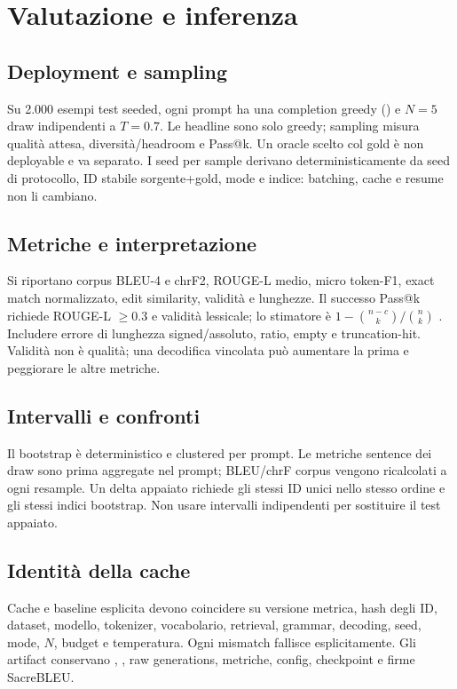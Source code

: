 \chapter{Valutazione e inferenza}\label{chap:evaluation}
\section{Deployment e sampling}
Su 2.000 esempi test seeded, ogni prompt ha una completion 
greedy () e $N=5$ draw  indipendenti a
$T=0.7$. Le headline sono solo greedy; sampling misura qualità attesa,
diversità/headroom e Pass@k. Un oracle scelto col gold è non deployable e va
separato. I seed per sample derivano deterministicamente da seed di protocollo,
ID stabile sorgente+gold, mode e indice: batching, cache e resume non li cambiano.

\section{Metriche e interpretazione}
Si riportano corpus BLEU-4 e chrF2, ROUGE-L medio, micro token-F1, exact match
normalizzato, edit similarity, validità e lunghezze. Il successo Pass@k richiede
ROUGE-L $\ge0.3$ e validità lessicale; lo stimatore è
$1-\binom{n-c}{k}/\binom nk$ \cite{chen2021codex}. Includere errore di lunghezza
signed/assoluto, ratio, empty e truncation-hit. Validità non è qualità; una
decodifica vincolata può aumentare la prima e peggiorare le altre metriche.

\section{Intervalli e confronti}
Il bootstrap è deterministico e clustered per prompt. Le metriche sentence dei
draw sono prima aggregate nel prompt; BLEU/chrF corpus vengono ricalcolati a ogni
resample. Un delta appaiato richiede gli stessi ID unici nello stesso ordine e
gli stessi indici bootstrap. Non usare intervalli indipendenti per sostituire il
test appaiato.

\section{Identità della cache}
Cache e baseline esplicita devono coincidere su versione metrica, hash degli ID,
dataset, modello, tokenizer, vocabolario, retrieval, grammar, decoding, seed,
mode, $N$, budget e temperatura. Ogni mismatch fallisce esplicitamente. Gli
artifact conservano , , raw
generations, metriche, config, checkpoint e firme SacreBLEU.
